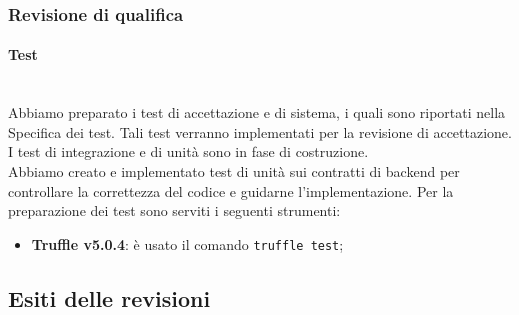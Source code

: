 \subsubsection{Revisione di qualifica}
\paragraph{Test}\mbox{}\\
Abbiamo preparato i test di accettazione e di sistema, i quali sono riportati nella Specifica dei test. Tali test verranno implementati per la revisione di accettazione.\\
I test di integrazione e di unità sono in fase di costruzione.\\
Abbiamo creato e implementato test di unità sui contratti di backend per controllare la correttezza del codice e guidarne l'implementazione. 
Per la preparazione dei test sono serviti i seguenti strumenti:
\begin{itemize}
	\item \textbf{Truffle v5.0.4}: è usato il comando \texttt{truffle test};
\end{itemize}

\subsection{Esiti delle revisioni}
